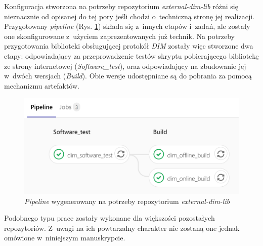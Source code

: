 \newpage

Konfiguracja stworzona na potrzeby repozytorium \textit{external-dim-lib} różni się nieznacznie od opisanej do tej pory jeśli chodzi o~techniczną stronę jej realizacji. Przygotowany \textit{pipeline} (Rys. \ref{fig:pipelineDIM}) składa się z~innych etapów i~zadań, ale zostały one skonfigurowane z~użyciem zaprezentowanych już technik. Na potrzeby przygotowania biblioteki obsługującej protokół \textit{DIM} zostały więc stworzone dwa etapy: odpowiadający za przeprowadzenie testów skryptu pobierającego bibliotekę ze strony internetowej (\textit{Software\_test}), oraz odpowiadający na zbudowanie jej w~dwóch wersjach (\textit{Build}). Obie wersje udostępniane są do pobrania za pomocą mechanizmu artefaktów.  

\begin{figure}[H]
\centering
\caption{\textit{Pipeline} wygenerowany na potrzeby repozytorium \textit{external-dim-lib}}
\label{fig:pipelineDIM}
\includegraphics[width=\textwidth]{res/png/pipelineDIM}
\end{figure}

Podobnego typu prace zostały wykonane dla większości pozostałych repozytoriów. Z~uwagi na ich powtarzalny charakter nie zostaną one jednak omówione w~niniejszym manuskrypcie. 

